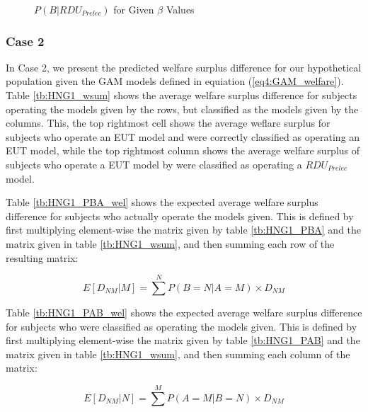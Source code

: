 \documentclass[../main.tex]{subfiles}
\begin{document}
\begin{figure}[hp!]
	\center
	\caption{$P(B|RDU_{Prelec})$ for Given $\beta$ Values}
	\label{fig:HNG1_EUT_PRE_welfare}
\end{figure}

\subsubsection{Case 2}

In Case 2, we present the predicted welfare surplus difference for our hypothetical population given the GAM models defined in equiation (\ref{eq4:GAM_welfare}).
Table \ref{tb:HNG1_wsum} shows the average welfare surplus difference for subjects operating the models given by the rows, but classified as the models given by the columns.
This, the top rightmost cell shows the average weflare surplus for subjects who operate an EUT model and were correctly classified as operating an EUT model, while the top rightmost column shows the average welfare surplus of subjects who operate a EUT model by were classified as operating a $\mathit{RDU_{Prelec}}$ model.

Table \ref{tb:HNG1_PBA_wel} shows the expected average welfare surplus difference for subjects who actually operate the models given.
This is defined by first multiplying element-wise the matrix given by table \ref{tb:HNG1_PBA} and the matrix given in table \ref{tb:HNG1_wsum}, and then summing each row of the resulting matrix:

\begin{equation}
	\label{eq4:PBA_wel}
	E [ D_{NM} | M ] = \sum^N P(B = N | A = M) \times D_{NM}
\end{equation}

Table \ref{tb:HNG1_PAB_wel} shows the expected average welfare surplus difference for subjects who were classified as operating the models given.
This is defined by first multiplying element-wise the matrix given by table \ref{tb:HNG1_PAB} and the matrix given in table \ref{tb:HNG1_wsum}, and then summing each column of the matrix:

\begin{equation}
	\label{eq4:PBA_wel2}
	E [ D_{NM} | N ] = \sum^M P(A = M | B = N) \times D_{NM}
\end{equation}
\end{document}
